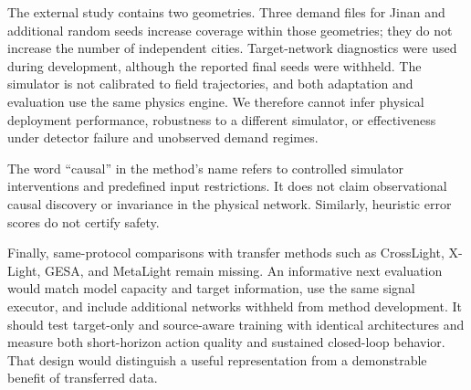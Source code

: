 The external study contains two geometries. Three demand files for Jinan and additional random seeds increase coverage within those geometries; they do not increase the number of independent cities. Target-network diagnostics were used during development, although the reported final seeds were withheld. The simulator is not calibrated to field trajectories, and both adaptation and evaluation use the same physics engine. We therefore cannot infer physical deployment performance, robustness to a different simulator, or effectiveness under detector failure and unobserved demand regimes.

The word ``causal'' in the method's name refers to controlled simulator interventions and predefined input restrictions. It does not claim observational causal discovery or invariance in the physical network. Similarly, heuristic error scores do not certify safety.

Finally, same-protocol comparisons with transfer methods such as CrossLight, X-Light, GESA, and MetaLight remain missing. An informative next evaluation would match model capacity and target information, use the same signal executor, and include additional networks withheld from method development. It should test target-only and source-aware training with identical architectures and measure both short-horizon action quality and sustained closed-loop behavior. That design would distinguish a useful representation from a demonstrable benefit of transferred data.
